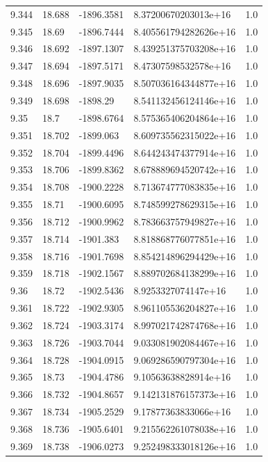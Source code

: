 \begin{tabular}{lllll}
9.344 & 18.688 & -1896.3581 & 8.37200670203013e+16 & 1.0 \\
9.345 & 18.69 & -1896.7444 & 8.405561794282626e+16 & 1.0 \\
9.346 & 18.692 & -1897.1307 & 8.439251375703208e+16 & 1.0 \\
9.347 & 18.694 & -1897.5171 & 8.47307598532578e+16 & 1.0 \\
9.348 & 18.696 & -1897.9035 & 8.507036164344877e+16 & 1.0 \\
9.349 & 18.698 & -1898.29 & 8.541132456124146e+16 & 1.0 \\
9.35 & 18.7 & -1898.6764 & 8.575365406204864e+16 & 1.0 \\
9.351 & 18.702 & -1899.063 & 8.609735562315022e+16 & 1.0 \\
9.352 & 18.704 & -1899.4496 & 8.644243474377914e+16 & 1.0 \\
9.353 & 18.706 & -1899.8362 & 8.678889694520742e+16 & 1.0 \\
9.354 & 18.708 & -1900.2228 & 8.713674777083835e+16 & 1.0 \\
9.355 & 18.71 & -1900.6095 & 8.748599278629315e+16 & 1.0 \\
9.356 & 18.712 & -1900.9962 & 8.783663757949827e+16 & 1.0 \\
9.357 & 18.714 & -1901.383 & 8.818868776077851e+16 & 1.0 \\
9.358 & 18.716 & -1901.7698 & 8.854214896294429e+16 & 1.0 \\
9.359 & 18.718 & -1902.1567 & 8.889702684138299e+16 & 1.0 \\
9.36 & 18.72 & -1902.5436 & 8.9253327074147e+16 & 1.0 \\
9.361 & 18.722 & -1902.9305 & 8.961105536204827e+16 & 1.0 \\
9.362 & 18.724 & -1903.3174 & 8.997021742874768e+16 & 1.0 \\
9.363 & 18.726 & -1903.7044 & 9.033081902084467e+16 & 1.0 \\
9.364 & 18.728 & -1904.0915 & 9.069286590797304e+16 & 1.0 \\
9.365 & 18.73 & -1904.4786 & 9.10563638828914e+16 & 1.0 \\
9.366 & 18.732 & -1904.8657 & 9.142131876157373e+16 & 1.0 \\
9.367 & 18.734 & -1905.2529 & 9.17877363833066e+16 & 1.0 \\
9.368 & 18.736 & -1905.6401 & 9.215562261078038e+16 & 1.0 \\
9.369 & 18.738 & -1906.0273 & 9.252498333018126e+16 & 1.0 \\

\end{tabular}
